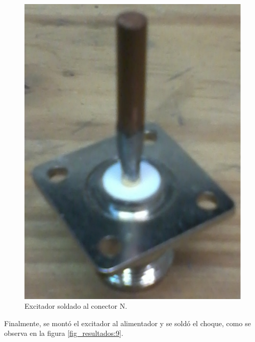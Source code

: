 \begin{figure} [H]
\centering 
\includegraphics[scale = 0.25]{Figures/Resultados/resultados_8}
\caption{Excitador soldado al conector N.}
\label{fig_resultados:8}
\end{figure}
Finalmente, se montó el excitador al alimentador y se soldó el choque, como se observa en la figura \ref{fig_resultados:9}.
